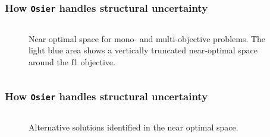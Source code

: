 \begin{frame}
    \frametitle{How \texttt{Osier} handles structural uncertainty}

    \begin{columns}
        \column[t]{4cm}

        \column[t]{6cm}
        \begin{figure}
            \centering
            \resizebox{\columnwidth}{!}{}
            \caption{Near optimal space for mono- and multi-objective problems. The light blue area shows
            a vertically truncated near-optimal space around the f1 objective.}
            \label{fig:near-opt-mga}
        \end{figure}
    \end{columns}

\end{frame}

\begin{frame}
    \frametitle{How \texttt{Osier} handles structural uncertainty}

    \begin{columns}
        \column[t]{4cm}

        \column[t]{6cm}
        \begin{figure}
            \centering
            \resizebox{\columnwidth}{!}{}
            \caption{Alternative solutions identified in the near optimal space.}
            \label{fig:nd-alt-points}
        \end{figure}
    \end{columns}

\end{frame}